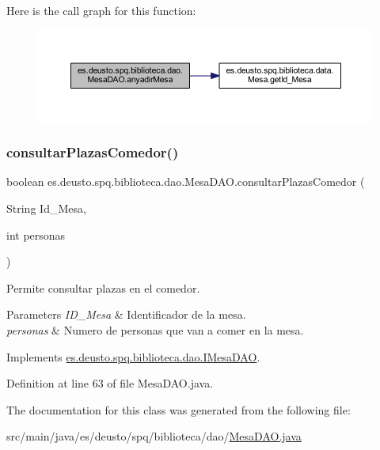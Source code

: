 Here is the call graph for this function\+:
\nopagebreak
\begin{figure}[H]
\begin{center}
\leavevmode
\includegraphics[width=350pt]{classes_1_1deusto_1_1spq_1_1biblioteca_1_1dao_1_1_mesa_d_a_o_aea7e6b72ca52e203015e78fa9f7d3817_cgraph}
\end{center}
\end{figure}
\mbox{\label{classes_1_1deusto_1_1spq_1_1biblioteca_1_1dao_1_1_mesa_d_a_o_a7631ebe9a7d3215db433ac29bb3e75c4}} 
\subsubsection{\texorpdfstring{consultar\+Plazas\+Comedor()}{consultarPlazasComedor()}}
{\footnotesize\ttfamily boolean es.\+deusto.\+spq.\+biblioteca.\+dao.\+Mesa\+D\+A\+O.\+consultar\+Plazas\+Comedor (\begin{DoxyParamCaption}\item[{String}]{Id\+\_\+\+Mesa,  }\item[{int}]{personas }\end{DoxyParamCaption})}

Permite consultar plazas en el comedor. 
\begin{DoxyParams}{Parameters}
{\em I\+D\+\_\+\+Mesa} & Identificador de la mesa. \\
\hline
{\em personas} & Numero de personas que van a comer en la mesa. \\
\hline
\end{DoxyParams}


Implements \mbox{\hyperlink{interfacees_1_1deusto_1_1spq_1_1biblioteca_1_1dao_1_1_i_mesa_d_a_o_a82ff152d68c25134fdffa41a1b08a347}{es.\+deusto.\+spq.\+biblioteca.\+dao.\+I\+Mesa\+D\+AO}}.



Definition at line 63 of file Mesa\+D\+A\+O.\+java.



The documentation for this class was generated from the following file\+:\begin{DoxyCompactItemize}
\item 
src/main/java/es/deusto/spq/biblioteca/dao/\mbox{\hyperlink{_mesa_d_a_o_8java}{Mesa\+D\+A\+O.\+java}}\end{DoxyCompactItemize}
